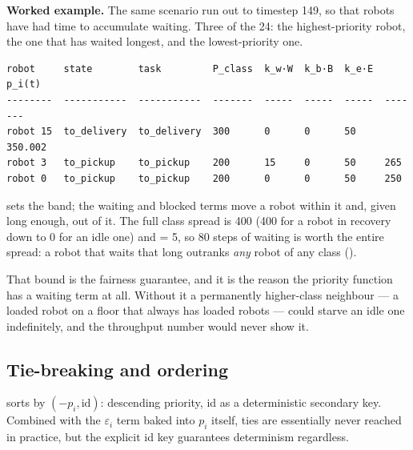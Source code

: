 \begin{workedexample}
\textbf{Worked example.} The same scenario run out to timestep 149, so that robots have had time to accumulate waiting. Three of the 24: the highest-priority robot, the one that has waited longest, and the lowest-priority one.

{\fontsize{8.5}{10.2}\selectfont
\begin{verbatim}
robot     state        task         P_class  k_w·W  k_b·B  k_e·E  p_i(t)
--------  -----------  -----------  -------  -----  -----  -----  -------
robot 15  to_delivery  to_delivery  300      0      0      50     350.002
robot 3   to_pickup    to_pickup    200      15     0      50     265
robot 0   to_pickup    to_pickup    200      0      0      50     250
\end{verbatim}
}

 sets the band; the waiting and blocked terms move a robot within it and, given long enough, out of it. The full class spread is 400 (400 for a robot in recovery down to 0 for an idle one) and  = 5, so 80 steps of waiting is worth the entire spread: a robot that waits that long outranks \emph{any} robot of any class ().

That bound is the fairness guarantee, and it is the reason the priority function has a waiting term at all. Without it a permanently higher-class neighbour — a loaded robot on a floor that always has loaded robots — could starve an idle one indefinitely, and the throughput number would never show it.
\end{workedexample}

\subsection{Tie-breaking and ordering}

 sorts by $(-p_i, \mathrm{id})$: descending priority,
id as a deterministic secondary key. Combined with the $\varepsilon_i$ term
baked into $p_i$ itself, ties are essentially never reached in practice, but
the explicit id key guarantees determinism regardless.
